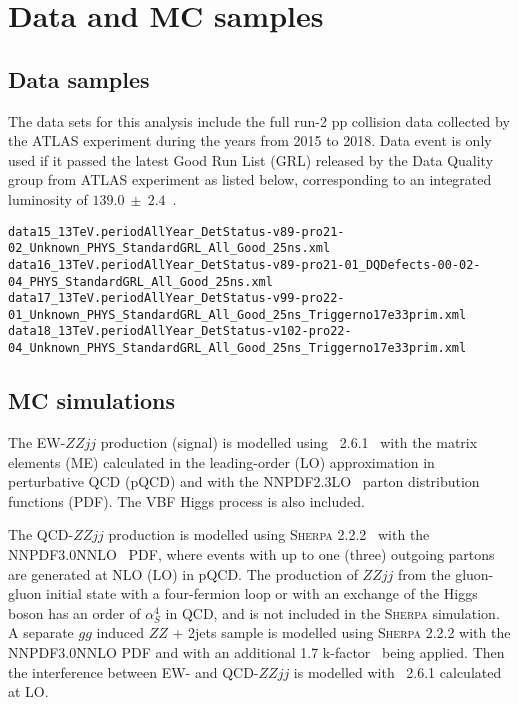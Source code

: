 \section{Data and MC samples}

\subsection{Data samples}
\label{sec:vbszz_data}

The data sets for this analysis include the full run-2 pp collision data collected by the ATLAS experiment during the years from 2015 to 2018.
Data event is only used if it passed the latest Good Run List (GRL) released by the Data Quality group from ATLAS experiment as listed below,
corresponding to an integrated luminosity of $139.0~\pm~2.4$~\ifb.


{\footnotesize
\begin{verbatim}
data15_13TeV.periodAllYear_DetStatus-v89-pro21-02_Unknown_PHYS_StandardGRL_All_Good_25ns.xml
data16_13TeV.periodAllYear_DetStatus-v89-pro21-01_DQDefects-00-02-04_PHYS_StandardGRL_All_Good_25ns.xml
data17_13TeV.periodAllYear_DetStatus-v99-pro22-01_Unknown_PHYS_StandardGRL_All_Good_25ns_Triggerno17e33prim.xml
data18_13TeV.periodAllYear_DetStatus-v102-pro22-04_Unknown_PHYS_StandardGRL_All_Good_25ns_Triggerno17e33prim.xml
\end{verbatim}
}

\subsection{MC simulations}
\label{sec:mc}

The EW-$ZZjj$ production (signal) is modelled using \MGMCatNLO~2.6.1~\cite{Alwall:2014hca} with the matrix elements (ME) calculated in the leading-order (LO) approximation
in perturbative QCD (pQCD) and with the NNPDF2.3LO~\cite{Ball:2012cx} parton distribution functions (PDF).
The VBF Higgs process is also included.

The QCD-$ZZjj$ production is modelled using \textsc{Sherpa} 2.2.2~\cite{Gleisberg:2008ta} with the NNPDF3.0NNLO~\cite{ball2015parton} PDF,
where events with up to one (three) outgoing partons are generated at NLO (LO) in pQCD.
The production of $ZZjj$ from the gluon-gluon initial state with a four-fermion loop or with an exchange of the Higgs boson has an order of $\alpha_{S}^{4}$ in QCD,
and is not included in the \textsc{Sherpa} simulation.
A separate $gg$ induced $ZZ$ + 2jets sample is modelled using \textsc{Sherpa} 2.2.2 with the NNPDF3.0NNLO PDF
and with an additional 1.7 k-factor~\cite{PhysRevD.92.094028} being applied.
Then the interference between EW- and QCD-$ZZjj$ is modelled with \MGMCatNLO~2.6.1 calculated at LO.

